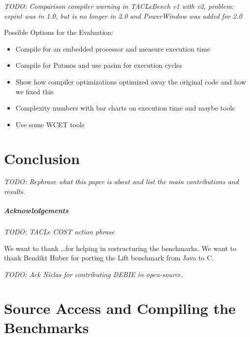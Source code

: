 \documentclass[a4paper,UKenglish]{oasics}
\newcommand{\todo}[1]{{\emph{TODO: #1}}}
\begin{document}
\todo{Comparison compiler warning in TACLeBench v1 with v2, problem: expint was in 1.0, but is no 
longer in 2.0 and PowerWindow was added for 2.0}

Possible Options for the Evaluation:

\begin{itemize}
\item Compile for an embedded processor and measure execution time
\item Compile for Patmos and use pasim for execution cycles
\item Show how compiler optimizations optimized away the original code and how we fixed this
\item Complexity numbers with bar charts on execution time and maybe tools
\item Use some WCET tools
\end{itemize}


\section{Conclusion}
\label{sec:conclusion}

\todo{Rephrase what this paper is about and list the main contributions and results.}

\subparagraph*{Acknowledgements}

\todo{TACLe COST action phrase}

We want to thank \dots for helping in restructuring the benchmarks.
We want to thank Bendikt Huber for porting the Lift benchmark from Java to C.

\todo{Ack Niclas for contributing DEBIE in open-source.}

\appendix
\section{Source Access and Compiling the Benchmarks}



\end{document}
